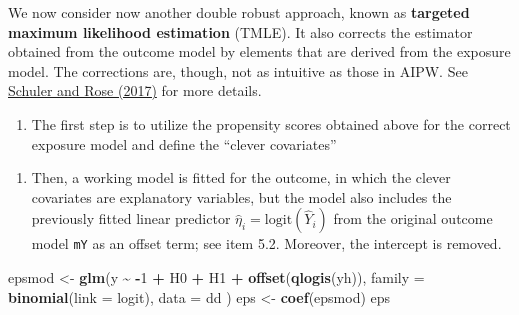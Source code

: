 \documentclass[
]{book}
\newenvironment{Shaded}{\begin{snugshade}}{\end{snugshade}}
\newcommand{\AttributeTok}[1]{\textcolor[rgb]{0.13,0.29,0.53}{#1}}
\newcommand{\DecValTok}[1]{\textcolor[rgb]{0.00,0.00,0.81}{#1}}
\newcommand{\FunctionTok}[1]{\textcolor[rgb]{0.13,0.29,0.53}{\textbf{#1}}}
\newcommand{\NormalTok}[1]{#1}
\newcommand{\OtherTok}[1]{\textcolor[rgb]{0.56,0.35,0.01}{#1}}
\newcommand{\SpecialCharTok}[1]{\textcolor[rgb]{0.81,0.36,0.00}{\textbf{#1}}}
\providecommand{\tightlist}{%
  \setlength{\itemsep}{0pt}\setlength{\parskip}{0pt}}
\begin{document}
We now consider now another double robust approach,
known as \textbf{targeted
maximum likelihood estimation} (TMLE).
It also corrects the estimator
obtained from the outcome model by elements that are derived from the exposure model. The corrections are, though, not as
intuitive as those in AIPW. See \href{https://doi.org/10.1093/aje/kww165}{Schuler and Rose
(2017)} for more details.

\begin{enumerate}
\def\labelenumi{\arabic{enumi}.}
\tightlist
\item
  The first step is to utilize the propensity scores
  obtained above for the correct exposure model
  and define the ``clever covariates''
\end{enumerate}

\begin{Shaded}
\end{Shaded}

\begin{enumerate}
\def\labelenumi{\arabic{enumi}.}
\setcounter{enumi}{1}
\tightlist
\item
  Then, a working model is fitted for the outcome,
  in which the clever
  covariates are explanatory variables, but the model
  also includes
  the previously fitted linear predictor
  \(\widehat{\eta}_i = \text{logit}(\widehat Y_i)\)
  from the original
  outcome model \texttt{mY} as an offset term; see item 5.2.
  Moreover, the intercept is removed.
\end{enumerate}

\begin{Shaded}
\begin{Highlighting}[]
\NormalTok{epsmod }\OtherTok{\textless{}{-}} \FunctionTok{glm}\NormalTok{(y }\SpecialCharTok{\textasciitilde{}} \SpecialCharTok{{-}}\DecValTok{1} \SpecialCharTok{+}\NormalTok{ H0 }\SpecialCharTok{+}\NormalTok{ H1 }\SpecialCharTok{+} \FunctionTok{offset}\NormalTok{(}\FunctionTok{qlogis}\NormalTok{(yh)),}
  \AttributeTok{family =} \FunctionTok{binomial}\NormalTok{(}\AttributeTok{link =}\NormalTok{ logit), }\AttributeTok{data =}\NormalTok{ dd}
\NormalTok{)}
\NormalTok{eps }\OtherTok{\textless{}{-}} \FunctionTok{coef}\NormalTok{(epsmod)}
\NormalTok{eps}
\end{Highlighting}
\end{Shaded}
\end{document}
